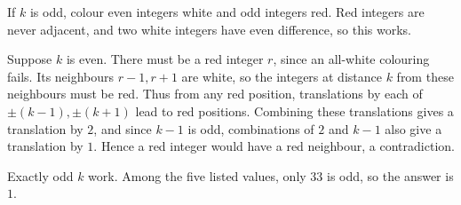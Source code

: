 If $k$ is odd, colour even integers white and odd integers red. Red integers are never adjacent, and two white integers have even difference, so this works.

Suppose $k$ is even. There must be a red integer $r$, since an all-white colouring fails. Its neighbours $r-1,r+1$ are white, so the integers at distance $k$ from these neighbours must be red. Thus from any red position, translations by each of $\pm(k-1),\pm(k+1)$ lead to red positions. Combining these translations gives a translation by $2$, and since $k-1$ is odd, combinations of $2$ and $k-1$ also give a translation by $1$. Hence a red integer would have a red neighbour, a contradiction.

Exactly odd $k$ work. Among the five listed values, only $33$ is odd, so the answer is $\boxed1$.
